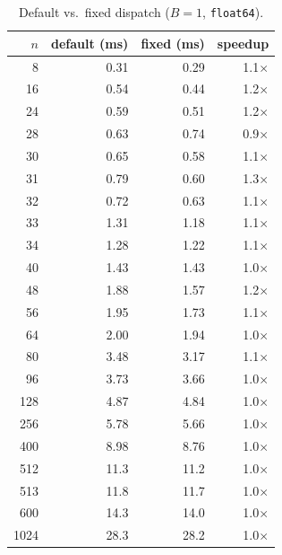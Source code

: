 \documentclass[10pt, letterpaper]{article}
\begin{document}
\begin{table}[h]
\centering
\caption{Default vs.\ fixed dispatch ($B = 1$, \texttt{float64}).}
\label{tab:f64_B1}
\begin{tabular}{r rrr}
\toprule
$n$ & default (ms) & fixed (ms) & speedup \\
\midrule
     8  &    0.31 &    0.29 & 1.1$\times$ \\
    16  &    0.54 &    0.44 & 1.2$\times$ \\
    24  &    0.59 &    0.51 & 1.2$\times$ \\
    28  &    0.63 &    0.74 & 0.9$\times$ \\
    30  &    0.65 &    0.58 & 1.1$\times$ \\
    31  &    0.79 &    0.60 & 1.3$\times$ \\
    32  &    0.72 &    0.63 & 1.1$\times$ \\
\midrule
    33  &    1.31 &    1.18 & 1.1$\times$ \\
    34  &    1.28 &    1.22 & 1.1$\times$ \\
    40  &    1.43 &    1.43 & 1.0$\times$ \\
    48  &    1.88 &    1.57 & 1.2$\times$ \\
    56  &    1.95 &    1.73 & 1.1$\times$ \\
    64  &    2.00 &    1.94 & 1.0$\times$ \\
    80  &    3.48 &    3.17 & 1.1$\times$ \\
    96  &    3.73 &    3.66 & 1.0$\times$ \\
   128  &    4.87 &    4.84 & 1.0$\times$ \\
   256  &    5.78 &    5.66 & 1.0$\times$ \\
   400  &    8.98 &    8.76 & 1.0$\times$ \\
   512  &    11.3 &    11.2 & 1.0$\times$ \\
   513  &    11.8 &    11.7 & 1.0$\times$ \\
   600  &    14.3 &    14.0 & 1.0$\times$ \\
  1024  &    28.3 &    28.2 & 1.0$\times$ \\
\bottomrule
\end{tabular}
\end{table}
\end{document}

